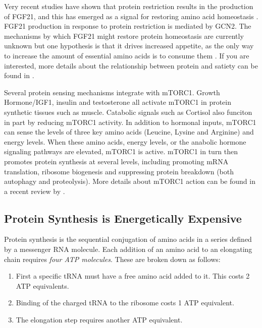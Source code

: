 \documentclass{tufte-handout}
\begin{document}
  Very recent studies have shown that protein restriction results in the production of FGF21, and this has emerged as a signal for restoring amino acid homeostasis \citep{Laeger2014}.  FGF21 production in response to protein restriction is mediated by GCN2.  The mechanisms by which FGF21 might restore protein homeostasis are currently unknown but one hypothesis is that it drives increased appetite, as the only way to increase the amount of essential amino acids is to consume them \citep{Solon-Biet2016a}.  If you are interested, more details about the relationship between protein and satiety can be found in \citet{Morrison2015}.

  Several protein sensing mechanisms integrate with mTORC1.  Growth Hormone/IGF1, insulin and testosterone all activate mTORC1 in protein synthetic tissues such as muscle.  Catabolic signals such as Cortisol also funciton in part by reducing mTORC1 activity.  In addition to hormonal inputs, mTORC1 can sense the levels of three key amino acids (Leucine, Lysine and Arginine) and energy levels.  When these amino acids, energy levels, or the anabolic hormone signaling pathways are elevated, mTORC1 is active.  mTORC1 in turn then promotes protein synthesis at several levels, including promoting mRNA translation, ribosome biogenesis and suppressing protein breakdown (both autophagy and proteolysis).  More details about mTORC1 action can be found in a recent review by \citet{Saxton2017}.

\subsection{Protein Synthesis is Energetically Expensive}

Protein synthesis is the sequential conjugation of amino acids in a series defined by a messenger RNA molecule.  Each addition of an amino acid to an elongating chain requires \emph{four ATP molecules}.  These are broken down as follows:

\begin{enumerate}
\item First a specific tRNA must have a free amino acid added to it.  This costs 2 ATP equivalents.
\item Binding of the charged tRNA to the ribosome costs 1 ATP equivalent.
\item The elongation step requires another ATP equivalent.
\end{enumerate}
\end{document}
